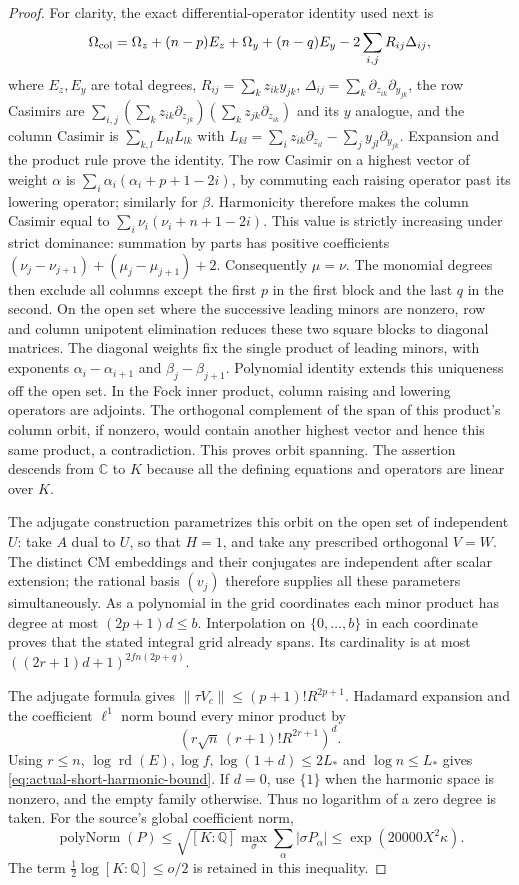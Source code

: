 \begin{proof}
For clarity, the exact differential-operator identity used next is
\[
 \Omega_{\rm col}=\Omega_z+(n-p)E_z
                   +\Omega_y+(n-q)E_y
                     -2\sum_{i,j}R_{ij}\Delta_{ij},
\]
where $E_z,E_y$ are total degrees,
$R_{ij}=\sum_k z_{ik}y_{jk}$,
$\Delta_{ij}=\sum_k\partial_{z_{ik}}\partial_{y_{jk}}$,
the row Casimirs are $\sum_{i,j}(\sum_kz_{ik}\partial_{z_{jk}})
(\sum_kz_{jk}\partial_{z_{ik}})$ and its $y$ analogue, and
the column Casimir is $\sum_{k,l}L_{kl}L_{lk}$ with
$L_{kl}=\sum_i z_{ik}\partial_{z_{il}}-
\sum_j y_{jl}\partial_{y_{jk}}$.
Expansion and the product rule prove the identity.
The row Casimir on a highest vector of weight $\alpha$ is
$\sum_i\alpha_i(\alpha_i+p+1-2i)$, by commuting each raising
operator past its lowering operator; similarly for $\beta$.
Harmonicity therefore makes the column Casimir equal to
$\sum_i\nu_i(\nu_i+n+1-2i)$.  This value is strictly increasing
under strict dominance: summation by parts has positive coefficients
$(\nu_j-\nu_{j+1})+(\mu_j-\mu_{j+1})+2$.
Consequently $\mu=\nu$.  The monomial degrees then exclude all
columns except the first $p$ in the first block and the last $q$ in
the second.  On the open set where the successive leading minors
are nonzero, row and column unipotent elimination reduces these two
square blocks to diagonal matrices.  The diagonal weights fix the
single product of leading minors, with exponents
$\alpha_i-\alpha_{i+1}$ and $\beta_j-\beta_{j+1}$.
Polynomial identity extends this uniqueness off the open set.
In the Fock inner product, column raising
and lowering operators are adjoints.  The orthogonal complement of
the span of this product's column orbit, if nonzero, would contain
another highest vector and hence this same product, a contradiction.
This proves orbit spanning.  The assertion descends from $\mathbb C$
to $K$ because all the defining equations and operators are linear
over $K$.

The adjugate construction parametrizes this orbit on the open set of
independent $U$: take $A$ dual to $U$, so that $H=1$, and take any
prescribed orthogonal $V=W$.  The distinct CM embeddings and their
conjugates are independent after scalar extension; the rational basis
$(v_j)$ therefore supplies all these parameters simultaneously.
As a polynomial in the grid coordinates each minor product has degree
at most $(2p+1)d\le b$.  Interpolation on $\{0,\ldots,b\}$ in
each coordinate proves that the stated integral grid already spans.
Its cardinality is at most
$((2r+1)d+1)^{2fn(2p+q)}$.

The adjugate formula gives
$\|\tau V_c\|\le(p+1)!R^{2p+1}$.
Hadamard expansion and the coefficient $\ell^1$ norm bound every
minor product by
\[
 \left(r\sqrt n\,(r+1)!R^{2r+1}\right)^d.
\]
Using $r\le n$, $\log\operatorname{rd}(E),\log f,
\log(1+d)\le2L_*$ and $\log n\le L_*$ gives
\eqref{eq:actual-short-harmonic-bound}.  If $d=0$, use $\{1\}$
when the harmonic space is nonzero, and the empty family otherwise.
Thus no logarithm of a zero degree is taken.  For the source's global
coefficient norm,
\[
 \operatorname{polyNorm}(P)
 \le\sqrt{[K:\mathbb Q]}\max_\sigma\sum_\alpha|\sigma P_\alpha|
 \le\exp(20000X^2\kappa).
\]
The term $\tfrac12\log[K:\mathbb Q]\le o/2$ is retained in this
inequality.


\end{proof}
